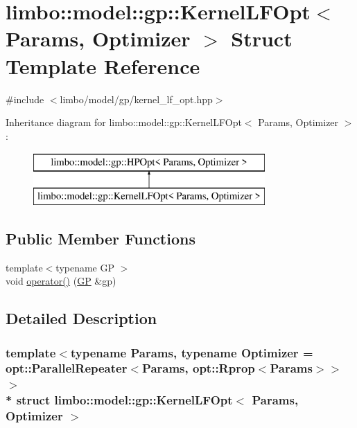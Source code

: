 \hypertarget{structlimbo_1_1model_1_1gp_1_1_kernel_l_f_opt}{}\section{limbo\+:\+:model\+:\+:gp\+:\+:Kernel\+L\+F\+Opt$<$ Params, Optimizer $>$ Struct Template Reference}
\label{structlimbo_1_1model_1_1gp_1_1_kernel_l_f_opt}


{\ttfamily \#include $<$limbo/model/gp/kernel\+\_\+lf\+\_\+opt.\+hpp$>$}

Inheritance diagram for limbo\+:\+:model\+:\+:gp\+:\+:Kernel\+L\+F\+Opt$<$ Params, Optimizer $>$\+:\begin{figure}[H]
\begin{center}
\leavevmode
\includegraphics[height=2.000000cm]{structlimbo_1_1model_1_1gp_1_1_kernel_l_f_opt}
\end{center}
\end{figure}
\subsection*{Public Member Functions}
\begin{DoxyCompactItemize}
\item 
{\footnotesize template$<$typename GP $>$ }\\void \hyperlink{structlimbo_1_1model_1_1gp_1_1_kernel_l_f_opt_af35e4e360f557fc34c4ea2bed3eeec28}{operator()} (\hyperlink{classlimbo_1_1model_1_1_g_p}{GP} \&gp)
\end{DoxyCompactItemize}


\subsection{Detailed Description}
\subsubsection*{template$<$typename Params, typename Optimizer = opt\+::\+Parallel\+Repeater$<$\+Params, opt\+::\+Rprop$<$\+Params$>$$>$$>$\\*
struct limbo\+::model\+::gp\+::\+Kernel\+L\+F\+Opt$<$ Params, Optimizer $>$}


